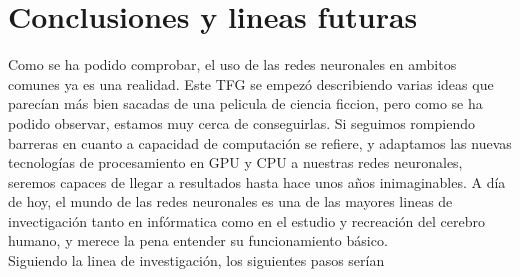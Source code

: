\chapter{Conclusiones y lineas futuras}
\label{chap:conclusiones}
Como se ha podido comprobar, el uso de las redes neuronales en ambitos comunes ya es una realidad. Este TFG se empezó describiendo varias ideas que parecían más bien sacadas de una pelicula de ciencia ficcion, pero como se ha podido observar, estamos muy cerca de conseguirlas. Si seguimos rompiendo barreras en cuanto a capacidad de computación se refiere, y adaptamos las nuevas tecnologías de procesamiento en GPU y CPU a nuestras redes neuronales, seremos capaces de llegar a resultados hasta hace unos años inimaginables. A día de hoy, el mundo de las redes neuronales es una de las mayores lineas de invectigación tanto en infórmatica como en el estudio y recreación del cerebro humano, y merece la pena entender su funcionamiento básico.\\

Siguiendo la linea de investigación, los siguientes pasos serían


\newpage \thispagestyle{empty}
